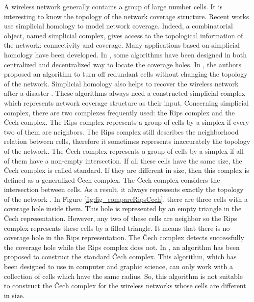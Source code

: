 \documentclass[conference]{IEEEtran}
\begin{document}
A wireless network generally contains a group of large number cells. It is interesting to know the topology of the network coverage structure. 
Recent works use simplicial homology to model network coverage.  Indeed, a combinatorial object, named simplicial complex, gives access to the topological information of the network: connectivity and coverage.
Many applications based on simplicial homology have been developed. In \cite{GhristMuhammadCoverageHoleDectection, DeSilvaCoordinateFree, FengConnectivityBasedDist}, some algorithms have been designed in both centralized and decentralized way to locate the coverage holes. In \cite{VergneReduction}, the authors proposed an algorithm to turn off redundant cells without changing the topology of the network. Simplicial homology also helps to recover the wireless network after a disaster \cite{vergne:hal-00800520}. 
These algorithms always need a constructed simplicial complex which represents network coverage structure as their input. 
Concerning simplicial complex, there are two complexes frequently used: the Rips complex and the \v{C}ech complex. The Rips complex represents a group of cells by a simplex if every two of them are neighbors. The Rips complex still describes the neighborhood relation between cells, therefore it sometimes represents inaccurately the topology of the network. The \v{C}ech complex represents a group of cells by a simplex if all of them have a non-empty intersection. If all these cells have the same size, the \v{C}ech complex is called standard. If they are different in size, then this complex is defined as a generalized \v{C}ech complex. The \v{C}ech complex considers the intersection between cells. As a result, it always represents exactly the topology of the network \cite[Theorem 1]{GhristMuhammadCoverageHoleDectection}. 
In Figure \ref{fig:fig_compareRipsCech}, there are three cells with a coverage hole inside them. This hole is represented by an empty triangle in the \v{C}ech representation. However, any two of these cells are neighbor so the Rips complex represents these cells by a filled triangle. It means that there is no coverage hole in the Rips representation. The \v{C}ech complex detects successfully the coverage hole while the Rips complex does not.
In \cite{DantchevConstructionCech}, an algorithm has been proposed to construct the standard \v{C}ech complex. This algorithm, which has been designed to use in computer and graphic science, can only work with a collection of cells which have the same radius. So, this algorithm is not suitable to construct the \v{C}ech complex for the wireless networks whose cells are different in size.\par
\end{document}
